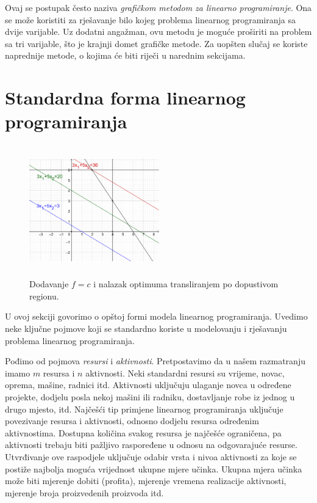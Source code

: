 \documentclass[a4paper, utf8, 11pt, colorlinks]{book}
\theoremstyle{definition}
\begin{document}
Ovaj se postupak često naziva \emph{grafičkom metodom za linearno programiranje}. Ona se može koristiti za rješavanje bilo kojeg problema linearnog programiranja sa dvije varijable. Uz dodatni angažman,  ovu metodu je moguće   proširiti na problem sa tri varijable, što je krajnji domet grafičke metode. Za uopšten slučaj se koriste naprednije metode,  o kojima će biti riječi u narednim sekcijama.

\section{Standardna forma linearnog programiranja}

\begin{figure}[!ht]
    \centering
    \includegraphics[width=160pt, height=160pt]{fig2.eps}
    \caption{Dodavanje $f = c$ i nalazak optimuma transliranjem po dopustivom regionu.}
    \label{fig:fig2}
\end{figure}

U ovoj sekciji govorimo o opštoj formi modela linearnog programiranja. Uvedimo neke ključne pojmove koji se standardno koriste u modelovanju i rješavanju problema linearnog programiranja. 

Pođimo od pojmova \textit{resursi} i \textit{aktivnosti}. Pretpostavimo da u našem razmatranju imamo $m$ resursa i $n$ aktivnosti. Neki standardni resursi su vrijeme, novac, oprema, mašine, radnici itd. Aktivnosti uključuju ulaganje novca u određene projekte, dodjelu posla nekoj mašini ili radniku,  dostavljanje robe iz jednog u drugo mjesto, itd. 
 Najčešći tip primjene linearnog programiranja uključuje povezivanje resursa i aktivnosti, odnosno dodjelu resursa određenim aktivnostima. Dostupna količina svakog resursa je najčešće ograničena, pa aktivnosti trebaju biti pažljivo raspoređene u odnosu na odgovarajuće resurse.  Utvrđivanje ove raspodjele uključuje odabir vrsta i nivoa aktivnosti za koje se postiže najbolja moguća vrijednost ukupne mjere učinka. Ukupna mjera učinka može biti mjerenje dobiti (profita), mjerenje vremena realizacije aktivnosti, mjerenje broja proizvedenih proizvoda itd.
\end{document}
